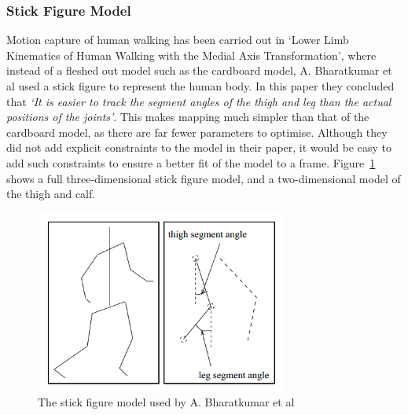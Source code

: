 \subsubsection{Stick Figure Model}

Motion capture of human walking has been carried out in `Lower Limb Kinematics of Human Walking with the Medial Axis Transformation'\cite{stickfigure}, where instead of a fleshed out model such as the cardboard model, A. Bharatkumar et al used a stick figure to represent the human body. In this paper they concluded that \emph{`It is easier to track the segment angles of the thigh and leg than the actual positions of the joints'}. This makes mapping much simpler than that of the cardboard model, as there are far fewer parameters to optimise. Although they did not add explicit constraints to the model in their paper, it would be easy to add such constraints to ensure a better fit of the model to a frame. Figure~\ref{fig:stickfiguremodel} shows a full three-dimensional stick figure model, and a two-dimensional model of the thigh and calf.

\begin{figure}[H]
    \centering
    \includegraphics[height=6cm]{background/images/stickfigure}

	\caption{The stick figure model used by A. Bharatkumar et al\cite{stickfigure}}
	\label{fig:stickfiguremodel}
\end{figure}